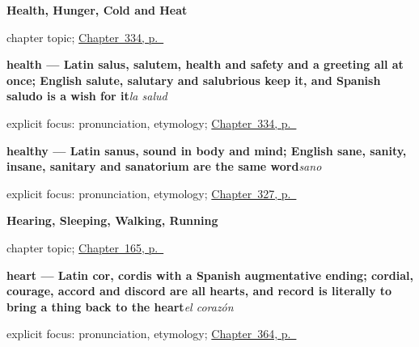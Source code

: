 \noindent\begin{minipage}[t]{\linewidth}
\raggedright
\textbf{Health, Hunger, Cold and Heat}\par
\footnotesize chapter topic; \hyperref[ch:salud-y-edad]{Chapter~334, p.~\pageref*{ch:salud-y-edad}}
\end{minipage}\par\smallskip

\noindent\begin{minipage}[t]{\linewidth}
\raggedright
\textbf{health — Latin salus, salutem, health and safety and a greeting all at once; English salute, salutary and salubrious keep it, and Spanish saludo is a wish for it}\enspace\emph{la salud}\par
\footnotesize explicit focus: pronunciation, etymology; \hyperref[ch:salud-y-edad]{Chapter~334, p.~\pageref*{ch:salud-y-edad}}
\end{minipage}\par\smallskip

\noindent\begin{minipage}[t]{\linewidth}
\raggedright
\textbf{healthy — Latin sanus, sound in body and mind; English sane, sanity, insane, sanitary and sanatorium are the same word}\enspace\emph{sano}\par
\footnotesize explicit focus: pronunciation, etymology; \hyperref[ch:despierto-y-sano]{Chapter~327, p.~\pageref*{ch:despierto-y-sano}}
\end{minipage}\par\smallskip

\noindent\begin{minipage}[t]{\linewidth}
\raggedright
\textbf{Hearing, Sleeping, Walking, Running}\par
\footnotesize chapter topic; \hyperref[ch:spanish-hear-sleep-walk-run]{Chapter~165, p.~\pageref*{ch:spanish-hear-sleep-walk-run}}
\end{minipage}\par\smallskip

\noindent\begin{minipage}[t]{\linewidth}
\raggedright
\textbf{heart — Latin cor, cordis with a Spanish augmentative ending; cordial, courage, accord and discord are all hearts, and record is literally to bring a thing back to the heart}\enspace\emph{el corazón}\par
\footnotesize explicit focus: pronunciation, etymology; \hyperref[ch:la-mujer-y-la-cara]{Chapter~364, p.~\pageref*{ch:la-mujer-y-la-cara}}
\end{minipage}\par\smallskip

